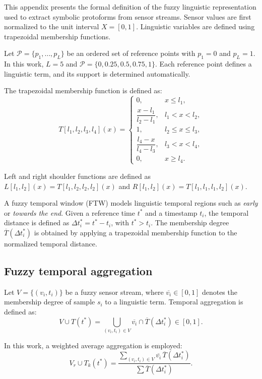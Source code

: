 \documentclass[preprint,12pt]{elsarticle}
\begin{document}
This appendix presents the formal definition of the fuzzy linguistic representation used to extract symbolic protoforms from sensor streams. Sensor values are first normalized to the unit interval $X=[0,1]$. Linguistic variables are defined using trapezoidal membership functions. 

Let $\mathcal{P}=\{p_1,\ldots,p_L\}$ be an ordered set of reference points with $p_1=0$ and $p_L=1$. In this work, $L=5$ and $\mathcal{P}=\{0,0.25,0.5,0.75,1\}$. Each reference point defines a linguistic term, and its support is determined automatically.

The trapezoidal membership function is defined as:
\begin{equation}
\label{eq:trap}
T[l_1,l_2,l_3,l_4](x)=
\begin{cases}
0, & x \le l_1, \\
\dfrac{x-l_1}{l_2-l_1}, & l_1 < x < l_2, \\
1, & l_2 \le x \le l_3, \\
\dfrac{l_4-x}{l_4-l_3}, & l_3 < x < l_4, \\
0, & x \ge l_4.
\end{cases}
\end{equation}

Left and right shoulder functions are defined as $L[l_1,l_2](x)=T[l_1,l_2,l_2,l_2](x)$ and $R[l_1,l_2](x)=T[l_1,l_1,l_1,l_2](x)$.


A fuzzy temporal window (FTW) models linguistic temporal regions such as \textit{early} or \textit{towards the end}. Given a reference time $t^*$ and a timestamp $t_i$, the temporal distance is defined as $\Delta t_i^* = t^* - t_i$, with $t^* > t_i$. The membership degree $\overline{T}(\Delta t_i^*)$ is obtained by applying a trapezoidal membership function to the normalized temporal distance.

\subsection{Fuzzy temporal aggregation}

Let $V=\{(v_i,t_i)\}$ be a fuzzy sensor stream, where $\overline{v_i} \in [0,1]$ denotes the membership degree of sample $s_i$ to a linguistic term. Temporal aggregation is defined as:
\begin{equation}
V \cup T(t^*) =
\bigcup_{(v_i,t_i)\in V}
\overline{v_i} \cap \overline{T}(\Delta t_i^*)
\in [0,1].
\end{equation}

In this work, a weighted average aggregation is employed:
\begin{equation}
V_r \cup T_k(t^*) =
\frac{\sum_{(v_i,t_i)\in V}
\overline{v_i}\,\overline{T}(\Delta t_i^*)}
{\sum \overline{T}(\Delta t_i^*)}.
\end{equation}
\end{document}
